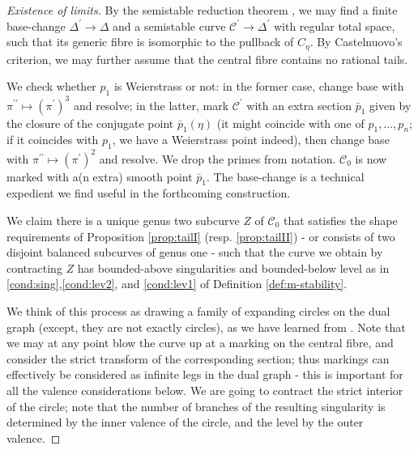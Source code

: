 \documentclass{compositio}
\renewcommand{\to}{\rightarrow}
\newcommand{\dvr}{\Delta}
\theoremstyle{plain}
\theoremstyle{definition}
\theoremstyle{remark}
\begin{document}
\begin{proof}[Existence of limits]
  By the semistable reduction theorem \cite[Corollary 2.7]{DM}, we may find a finite base-change $\dvr^\prime\to\dvr$ and a semistable curve $\mathcal C^\prime\to\dvr^\prime$ with regular total space, such that its generic fibre is isomorphic to the pullback of $C_\eta$. By Castelnuovo's criterion, we may further assume that the central fibre contains no rational tails.
  
  We check whether $p_1$ is Weierstrass or not: in the former case, change base with $\pi^{\prime\prime}\mapsto(\pi^\prime)^3$ and resolve; in the latter, mark $\mathcal C^\prime$ with an extra section $\bar p_1$ given by the closure of the conjugate point $\bar p_1(\eta)$ (it might coincide with one of $p_1,\ldots,p_n$; if it coincides with $p_1$, we have a Weierstrass point indeed), then change base with $\pi^{\prime\prime}\mapsto(\pi^\prime)^2$ and resolve. We drop the primes from notation. $\mathcal C_0$ is now marked with a(n extra) smooth point $\bar p_1$. The base-change is a technical expedient we find useful in the forthcoming construction.
  
  We claim there is a unique genus two subcurve $Z$ of $\mathcal C_0$ that satisfies the shape requirements of Proposition \ref{prop:tailI} (resp. \ref{prop:tailII}) - or consists of two disjoint balanced subcurves of genus one - such that the curve we obtain by contracting $Z$ has bounded-above singularities and bounded-below level as in \eqref{cond:sing},\eqref{cond:lev2}, and \eqref{cond:lev1} of Definition \ref{def:m-stability}.
  
  We think of this process as drawing a family of expanding circles on the dual graph (except, they are not exactly circles), as we have learned from \cite{RSPW1}. Note that we may at any point blow the curve up at a marking on the central fibre, and consider the strict transform of the corresponding section; thus markings can effectively be considered as infinite legs in the dual graph - this is important for all the valence considerations below. We are going to contract the strict interior of the circle; note that the number of branches of the resulting singularity is determined by the inner valence of the circle, and the level by the outer valence.
  

\end{proof}
\end{document}

